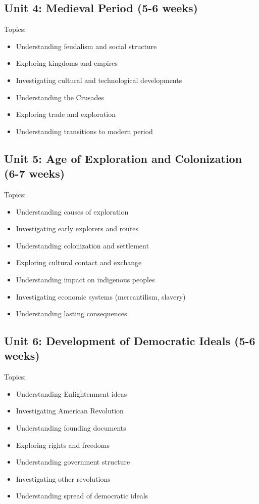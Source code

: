 \documentclass[11pt,letterpaper]{report}
\begin{document}
\subsection{Unit 4: Medieval Period (5-6 weeks)}

Topics:
\begin{itemize}
\item Understanding feudalism and social structure
\item Exploring kingdoms and empires
\item Investigating cultural and technological developments
\item Understanding the Crusades
\item Exploring trade and exploration
\item Understanding transitions to modern period
\end{itemize}

\subsection{Unit 5: Age of Exploration and Colonization (6-7 weeks)}

Topics:
\begin{itemize}
\item Understanding causes of exploration
\item Investigating early explorers and routes
\item Understanding colonization and settlement
\item Exploring cultural contact and exchange
\item Understanding impact on indigenous peoples
\item Investigating economic systems (mercantilism, slavery)
\item Understanding lasting consequences
\end{itemize}

\subsection{Unit 6: Development of Democratic Ideals (5-6 weeks)}

Topics:
\begin{itemize}
\item Understanding Enlightenment ideas
\item Investigating American Revolution
\item Understanding founding documents
\item Exploring rights and freedoms
\item Understanding government structure
\item Investigating other revolutions
\item Understanding spread of democratic ideals
\end{itemize}
\end{document}
